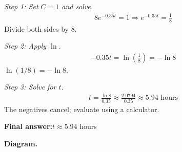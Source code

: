 \documentclass[11pt]{article}
\begin{document}
\textit{Step 1: Set \( C = 1 \) and solve.}
\[\begin{gathered}
8e^{-0.35t} = 1 \Rightarrow e^{-0.35t} = \frac{1}{8}
\end{gathered}\]
Divide both sides by 8.

\textit{Step 2: Apply \( \ln \).}
\[\begin{gathered}
-0.35t = \ln\!\left(\frac{1}{8}\right) = -\ln 8
\end{gathered}\]
\( \ln(1/8) = -\ln 8 \).

\textit{Step 3: Solve for \( t \).}
\[\begin{gathered}
t = \frac{\ln 8}{0.35} \approx \frac{2.0794}{0.35} \approx 5.94 \text{ hours}
\end{gathered}\]
The negatives cancel; evaluate using a calculator.

\begin{answerbox}
\textbf{Final answer:}\quad \(\displaystyle  t \approx 5.94 \) hours
\end{answerbox}
\textbf{Diagram.}
\end{document}
